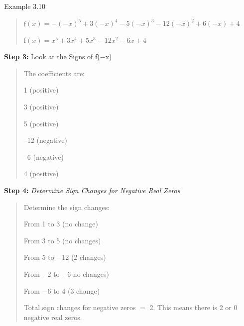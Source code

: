 \begin{example}{Example 3.10}
\begin{quote}
f$(x) = -(-x)^5 + 3(-x)^4 - 5(-x)^3 - 12(-x)^2 + 6(-x) + 4$

f$(x) = x^5 + 3x^4 + 5x^3 - 12x^2 - 6x + 4$
\end{quote}
\textbf{Step 3:} Look at the Signs of f($-$x)
\begin{quote}
The coefficients are:

1 (positive)

3 (positive)

5 (positive)

--12 (negative)

--6 (negative)

4 (positive)
\end{quote}
\textbf{Step 4:} \textit{Determine Sign Changes for Negative Real Zeros}
\begin{quote}
Determine the sign changes:

From 1 to 3 (no change)

From 3 to 5 (no changes)

From 5 to $-12$ (2 changes)

From $-2$ to $-6$ no changes)

From $-6$ to 4 (3 change)

Total sign changes for negative zeros $=$ 2. This means there is 2 or 0 negative
real zeros.
\end{quote}
\end{example}
